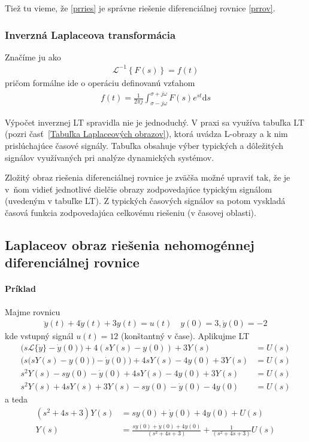\documentclass[a4paper, 10pt, ]{article}
\begin{document}
Tiež tu vieme, že \eqref{prries} je správne riešenie diferenciálnej rovnice \eqref{prrov}.

\subsubsection{Inverzná Laplaceova transformácia}

Značíme ju ako
\begin{align}
    \mathcal L ^{-1} \left\{ F(s) \right\} = f(t)
\end{align}
pričom formálne ide o operáciu definovanú vzťahom
\begin{align}
    f(t) = \frac{1}{2\pi j} \int_{\sigma-j\omega}^{\sigma + j\omega} F(s) e^{st} \text{d}s
\end{align}

Výpočet inverznej LT spravidla nie je jednoduchý. V praxi sa využíva tabuľka LT (pozri časť~\ref{Tabuľka Laplaceových obrazov}), ktorá uvádza L-obrazy a k nim prislúchajúce časové signály. Tabuľka obsahuje výber typických a dôležitých signálov využívaných pri analýze dynamických systémov.

Zložitý obraz riešenia diferenciálnej rovnice je zväčša možné upraviť tak, že je v~ňom vidieť jednotlivé dielčie obrazy zodpovedajúce typickým signálom (uvedeným v tabuľke LT). Z typických časových signálov sa potom vyskladá časová funkcia zodpovedajúca celkovému riešeniu (v časovej oblasti).





\subsection{Laplaceov obraz riešenia nehomogénnej diferenciálnej rovnice}

\paragraph{Príklad}

Majme rovnicu
\begin{align}
    \ddot y(t) +4 \dot y(t) + 3y(t) = u(t) \quad y(0) = 3, \dot y(0) = -2
\end{align}
kde vstupný signál $u(t) = 12$ (konštantný v čase). Aplikujme LT
\begin{align}
    \big( s \mathcal L \{\dot y\} - \dot y(0) \big) + 4 \left( sY(s) - y(0) \right) + 3 Y(s) &=  U(s) \\
    \Big( s \big( sY(s) - y(0) \big) - \dot y(0) \Big) + 4sY(s) - 4y(0) + 3Y(s) &= U(s) \\
    s^2Y(s) - sy(0) - \dot y(0)  + 4sY(s) - 4y(0) + 3Y(s) &= U(s) \\
    s^2Y(s)   + 4sY(s)  + 3Y(s) - sy(0) - \dot y(0) - 4y(0) &= U(s)
\end{align}
a teda
\begin{align}
    \left( s^2   + 4s  + 3\right)Y(s) &= sy(0) +  \dot y(0) + 4y(0) + U(s) \\
    Y(s) &= \frac{sy(0) +  \dot y(0) + 4y(0)}{\left( s^2   + 4s  + 3\right)} + \frac{1}{\left( s^2   + 4s  + 3\right)}U(s)
\end{align}
\end{document}
